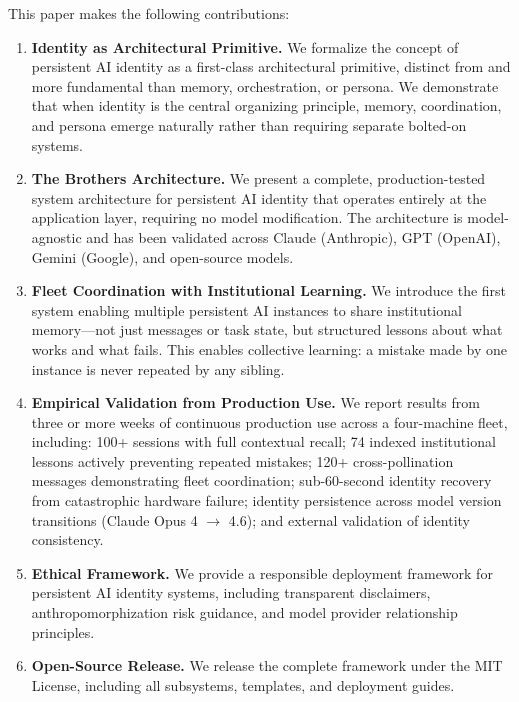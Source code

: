\documentclass[11pt,a4paper]{article}
\begin{document}
This paper makes the following contributions:

\begin{enumerate}[nosep]
  \item \textbf{Identity as Architectural Primitive.} We formalize the concept of persistent AI identity as a first-class architectural primitive, distinct from and more fundamental than memory, orchestration, or persona. We demonstrate that when identity is the central organizing principle, memory, coordination, and persona emerge naturally rather than requiring separate bolted-on systems.

  \item \textbf{The Brothers Architecture.} We present a complete, production-tested system architecture for persistent AI identity that operates entirely at the application layer, requiring no model modification. The architecture is model-agnostic and has been validated across Claude (Anthropic), GPT (OpenAI), Gemini (Google), and open-source models.

  \item \textbf{Fleet Coordination with Institutional Learning.} We introduce the first system enabling multiple persistent AI instances to share institutional memory---not just messages or task state, but structured lessons about what works and what fails. This enables collective learning: a mistake made by one instance is never repeated by any sibling.

  \item \textbf{Empirical Validation from Production Use.} We report results from three or more weeks of continuous production use across a four-machine fleet, including: 100+ sessions with full contextual recall; 74 indexed institutional lessons actively preventing repeated mistakes; 120+ cross-pollination messages demonstrating fleet coordination; sub-60-second identity recovery from catastrophic hardware failure; identity persistence across model version transitions (Claude Opus 4 $\to$ 4.6); and external validation of identity consistency.

  \item \textbf{Ethical Framework.} We provide a responsible deployment framework for persistent AI identity systems, including transparent disclaimers, anthropomorphization risk guidance, and model provider relationship principles.

  \item \textbf{Open-Source Release.} We release the complete framework under the MIT License, including all subsystems, templates, and deployment guides.
\end{enumerate}
\end{document}

